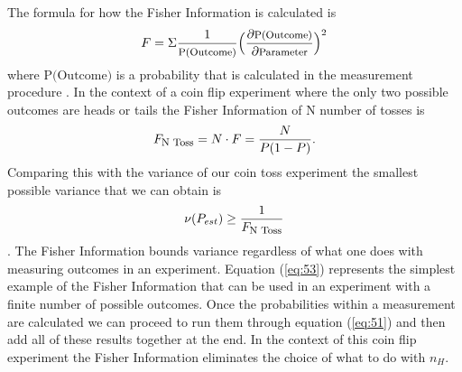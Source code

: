 \documentclass[twocolumn]{article}
\begin{document}
The formula for how the Fisher Information is calculated is 
\begin{equation} \label{eq:51}
F=\Sigma\frac{1}{\text{\footnotesize{P(Outcome)}}}\Big(\frac{\partial \text{\footnotesize{P(Outcome)}}}{\partial\text{\footnotesize{Parameter}}}\Big)^2
\end{equation}
where $\text{P(Outcome)}$ is a probability that is calculated in the measurement procedure \cite{Paris}. In the context of a coin flip experiment where the only two possible outcomes are heads or tails the Fisher Information of N number of tosses is
\begin{equation} \label{eq:52}
F_{\text{\footnotesize{N Toss}}}=N\cdot F=\frac{N}{P(1-P)}.
\end{equation}
Comparing this with the variance of our coin toss experiment the smallest possible variance that we can obtain is
\begin{equation} \label{eq:53}
\nu(P_{est})\geq\frac{1}{F_{\text{\footnotesize{N Toss}}}}
\end{equation}
\cite{D. Collins}. The Fisher Information bounds variance regardless of what one does with measuring outcomes in an experiment. Equation (\ref{eq:53}) represents the simplest example of the Fisher Information that can be used in an experiment with a finite number of possible outcomes. Once the probabilities within a measurement are calculated we can proceed to run them through equation (\ref{eq:51}) and then add all of these results together at the end. In the context of this coin flip experiment the Fisher Information eliminates the choice of what to do with $n_H$.
\end{document}
